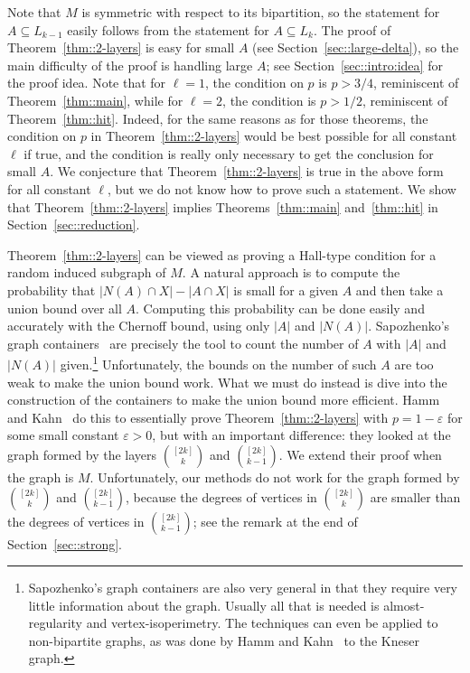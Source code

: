 \documentclass[12pt]{article}
\newcommand{\ep}{\varepsilon}
\begin{document}
Note that $M$ is symmetric with respect to its bipartition, so the statement for $A \subseteq L_{k-1}$ easily follows from the statement for $A \subseteq L_k$. The proof of Theorem~\ref{thm::2-layers} is easy for small $A$ (see Section~\ref{sec::large-delta}), so the main difficulty of the proof is handling large $A$; see Section~\ref{sec::intro:idea} for the proof idea. Note that for $\ell = 1$, the condition on $p$ is $p>3/4$, reminiscent of Theorem~\ref{thm::main}, while for $\ell = 2$, the condition is $p>1/2$, reminiscent of Theorem~\ref{thm::hit}. Indeed, for the same reasons as for those theorems, the condition on $p$ in Theorem~\ref{thm::2-layers} would be best possible for all constant $\ell$ if true, and the condition is really only necessary to get the conclusion for small $A$. We conjecture that Theorem~\ref{thm::2-layers} is true in the above form for all constant $\ell$, but we do not know how to prove such a statement. We show that Theorem~\ref{thm::2-layers} implies Theorems~\ref{thm::main} and~\ref{thm::hit} in Section~\ref{sec::reduction}.

Theorem~\ref{thm::2-layers} can be viewed as proving a Hall-type condition for a random induced subgraph of $M$. A natural approach is to compute the probability that $|N(A) \cap X| - |A \cap X|$ is small for a given $A$ and then take a union bound over all $A$. Computing this probability can be done easily and accurately with the Chernoff bound, using only $|A|$ and $|N(A)|$. Sapozhenko's graph containers~\cite{Sap} are precisely the tool to count the number of $A$ with $|A|$ and $|N(A)|$ given.\footnote{Sapozhenko's graph containers are also very general in that they require very little information about the graph. Usually all that is needed is almost-regularity and vertex-isoperimetry. The techniques can even be applied to non-bipartite graphs, as was done by Hamm and Kahn~\cite{HK2} to the Kneser graph.} Unfortunately, the bounds on the number of such $A$ are too weak to make the union bound work. What we must do instead is dive into the construction of the containers to make the union bound more efficient. Hamm and Kahn~\cite{HK2} do this to essentially prove Theorem~\ref{thm::2-layers} with $p=1-\ep$ for some small constant $\ep>0$, but with an important difference: they looked at the graph formed by the layers $\binom{[2k]}{k}$ and $\binom{[2k]}{k-1}$. We extend their proof when the graph is $M$. Unfortunately, our methods do not work for the graph formed by $\binom{[2k]}{k}$ and $\binom{[2k]}{k-1}$, because the degrees of vertices in $\binom{[2k]}{k}$ are smaller than the degrees of vertices in $\binom{[2k]}{k-1}$; see the remark at the end of Section~\ref{sec::strong}.
\end{document}
